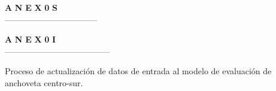 \documentclass[12pt, oneside]{article} %
\begin{document}
\begin{titlepage}


\normalsize
\vspace*{9cm} 

\noindent


 \begin{flushright}
 \fontsize{40pt}{40pt}\selectfont 	
 \uppercase\expandafter{}  \textbf{A} \hspace{0.3pt} \textbf{N}  \hspace{0.3pt} \textbf{E} \hspace{0.3pt}  \textbf{X} \hspace{0.3pt}   \textbf{0} \hspace{0.3pt}    \textbf{S}  \\
  \vspace*{-0.5cm} 
 ---------------------------------\\
\end{flushright} 




\vfill
\end{titlepage}


\begingroup
\begin{titlepage}
   \normalsize
\vspace*{7cm} 

\noindent


 \begin{flushright}
 \fontsize{35pt}{35pt}\selectfont 	
 \uppercase\expandafter{}  \textbf{A} \hspace{0.2pt} \textbf{N}  \hspace{0.2pt} \textbf{E} \hspace{0.2pt}  \textbf{X} \hspace{0.2pt}   \textbf{0} \hspace{8.5pt}    \textbf{I}  \\
 \vspace*{-0.5cm} 
 --------------------------------------\\
\end{flushright} 

\vspace*{-1.5cm} 

 \begin{flushright}
  \fontsize{14pt}{14pt}\selectfont 
 Proceso de actualización de datos de entrada al modelo de evaluación de anchoveta centro-sur.
 \end{flushright} 
      
\end{titlepage}
\endgroup
\end{document}
